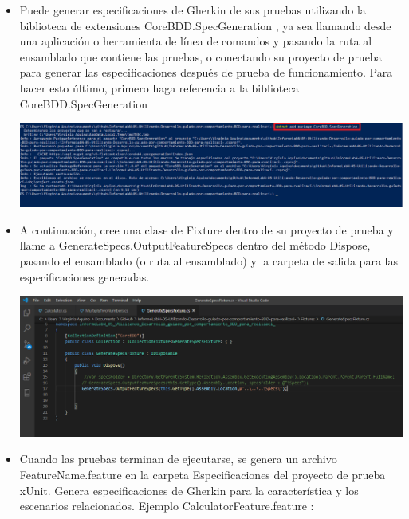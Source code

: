 \begin{itemize}
\begin{center}
\end{center}
\item Puede generar especificaciones de Gherkin de sus pruebas utilizando la biblioteca de
extensiones CoreBDD.SpecGeneration , ya sea llamando desde una aplicación o herramienta de línea de
comandos y pasando la ruta al ensamblado que contiene las pruebas, o conectando su proyecto de
prueba para generar las especificaciones después de prueba de funcionamiento.
Para hacer esto último, primero haga referencia a la biblioteca CoreBDD.SpecGeneration
\begin{center}
\includegraphics[width=\columnwidth]{images/5}\newline
\end{center}
\item A continuación, cree una clase de Fixture dentro de su proyecto de prueba y llame
a GenerateSpecs.OutputFeatureSpecs dentro del método Dispose, pasando el ensamblado (o ruta al
ensamblado) y la carpeta de salida para las especificaciones generadas.
\begin{center}
\includegraphics[width=\columnwidth]{images/006}\newline
\end{center}
\item Cuando las pruebas terminan de ejecutarse, se genera un archivo FeatureName.feature en la carpeta
Especificaciones del proyecto de prueba xUnit. Genera especificaciones de Gherkin para la característica y
los escenarios relacionados. Ejemplo CalculatorFeature.feature :
\begin{center}

\end{center}
\end{itemize}
